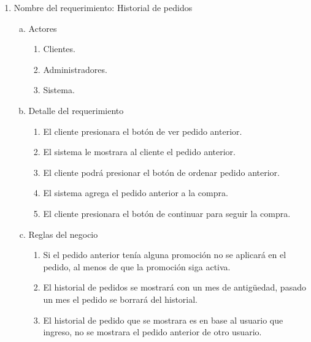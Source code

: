 \documentclass[conference]{IEEEtran}
\begin{document}
\begin{enumerate}
\item Nombre del requerimiento: Historial de pedidos
\begin{enumerate}[a)]
\item Actores
	\begin{enumerate}[a]
	\item Clientes.
	\item Administradores.
	\item Sistema.
	\end{enumerate}
\item Detalle del requerimiento
	\begin{enumerate}[P{a}so 1.]
	\item El cliente presionara el botón de ver pedido anterior.
	\item El sistema le mostrara al cliente el pedido anterior.
	\item El cliente podrá presionar el botón de ordenar 	pedido anterior.
	\item El sistema agrega el pedido anterior a la 		compra.
	\item El cliente presionara el botón de continuar 		para seguir la compra.
	\end{enumerate}
\item Reglas del negocio
	\begin{enumerate}[a]
	\item Si el pedido anterior tenía alguna promoción no se aplicará en el pedido, al menos de que la promoción siga activa.
	\item El historial de pedidos se mostrará con un mes de antigüedad, pasado un mes el pedido se borrará del historial.
	\item El historial de pedido que se mostrara es en base al usuario que ingreso, no se mostrara el pedido anterior de otro usuario.

	\end{enumerate}
\end{enumerate}


\end{enumerate}
\end{document}
